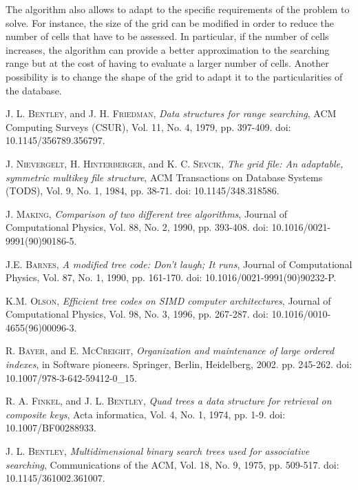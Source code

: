 \documentclass[review]{elsarticle}
\begin{document}
The algorithm also allows to adapt to the specific requirements of the problem to solve. For instance, the size of the grid can be modified in order to reduce the number of cells that have to be assessed. In particular, if the number of cells increases, the algorithm can provide a better approximation to the searching range but at the cost of having to evaluate a larger number of cells. Another possibility is to change the shape of the grid to adapt it to the particularities of the database.


\begin{thebibliography}{00}


 \textsc{J. L. Bentley}, and \textsc{J. H. Friedman},
\textit{Data structures for range searching}, ACM Computing Surveys (CSUR), Vol. 11, No. 4, 1979, pp. 397-409. doi: 10.1145/356789.356797.

 \textsc{J. Nievergelt, H. Hinterberger}, and \textsc{K. C. Sevcik},
\textit{The grid file: An adaptable, symmetric multikey file structure}, ACM Transactions on Database Systems (TODS), Vol. 9, No. 1, 1984, pp. 38-71. doi: 10.1145/348.318586.

 \textsc{J. Making},
\textit{Comparison of two different tree algorithms}, Journal of Computational Physics, Vol. 88, No. 2, 1990, pp. 393-408. doi: 10.1016/0021-9991(90)90186-5.

 \textsc{J.E. Barnes},
\textit{A modified tree code: Don't laugh; It runs}, Journal of Computational Physics, Vol. 87, No. 1, 1990, pp. 161-170. doi: 10.1016/0021-9991(90)90232-P.

 \textsc{K.M. Olson},
\textit{Efficient tree codes on SIMD computer architectures}, Journal of Computational Physics, Vol. 98, No. 3, 1996, pp. 267-287. doi: 10.1016/0010-4655(96)00096-3.

 \textsc{R. Bayer}, and \textsc{E. McCreight},
\textit{Organization and maintenance of large ordered indexes}, in Software pioneers. Springer, Berlin, Heidelberg, 2002. pp. 245-262. doi: 10.1007/978-3-642-59412-0\_15.

 \textsc{R. A. Finkel}, and \textsc{J. L. Bentley},
\textit{Quad trees a data structure for retrieval on composite keys}, Acta informatica, Vol. 4, No. 1, 1974, pp. 1-9. doi: 10.1007/BF00288933.

 \textsc{J. L. Bentley},
\textit{Multidimensional binary search trees used for associative searching}, Communications of the ACM, Vol. 18, No. 9, 1975, pp. 509-517. doi: 10.1145/361002.361007.


\end{thebibliography}
\end{document}
